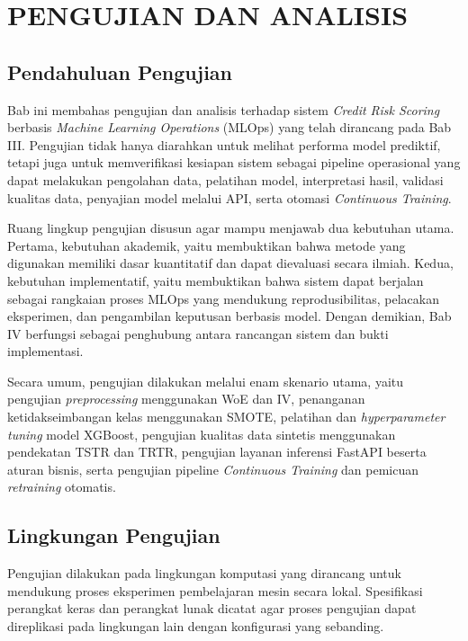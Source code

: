 \chapter{PENGUJIAN DAN ANALISIS}
\label{sec:chap4_pengujian}

\section{Pendahuluan Pengujian}
Bab ini membahas pengujian dan analisis terhadap sistem \textit{Credit Risk Scoring} berbasis \textit{Machine Learning Operations} (MLOps) yang telah dirancang pada Bab III. Pengujian tidak hanya diarahkan untuk melihat performa model prediktif, tetapi juga untuk memverifikasi kesiapan sistem sebagai pipeline operasional yang dapat melakukan pengolahan data, pelatihan model, interpretasi hasil, validasi kualitas data, penyajian model melalui API, serta otomasi \textit{Continuous Training}.

Ruang lingkup pengujian disusun agar mampu menjawab dua kebutuhan utama. Pertama, kebutuhan akademik, yaitu membuktikan bahwa metode yang digunakan memiliki dasar kuantitatif dan dapat dievaluasi secara ilmiah. Kedua, kebutuhan implementatif, yaitu membuktikan bahwa sistem dapat berjalan sebagai rangkaian proses MLOps yang mendukung reprodusibilitas, pelacakan eksperimen, dan pengambilan keputusan berbasis model. Dengan demikian, Bab IV berfungsi sebagai penghubung antara rancangan sistem dan bukti implementasi.

Secara umum, pengujian dilakukan melalui enam skenario utama, yaitu pengujian \textit{preprocessing} menggunakan WoE dan IV, penanganan ketidakseimbangan kelas menggunakan SMOTE, pelatihan dan \textit{hyperparameter tuning} model XGBoost, pengujian kualitas data sintetis menggunakan pendekatan TSTR dan TRTR, pengujian layanan inferensi FastAPI beserta aturan bisnis, serta pengujian pipeline \textit{Continuous Training} dan pemicuan \textit{retraining} otomatis.

\section{Lingkungan Pengujian}
\label{sec:bab4_lingkungan_pengujian}
Pengujian dilakukan pada lingkungan komputasi yang dirancang untuk mendukung proses eksperimen pembelajaran mesin secara lokal. Spesifikasi perangkat keras dan perangkat lunak dicatat agar proses pengujian dapat direplikasi pada lingkungan lain dengan konfigurasi yang sebanding.

